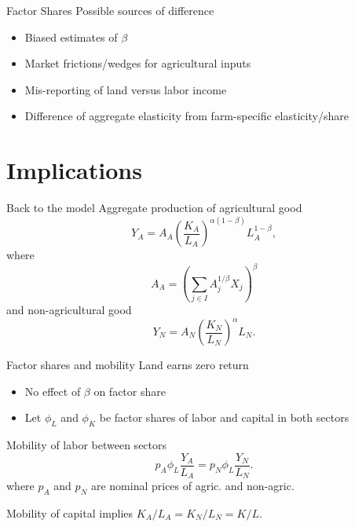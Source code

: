 \documentclass[10pt, xcolor=dvipsnames]{beamer}
\begin{document}
\begin{frame}{Factor Shares}
Possible sources of difference
\begin{itemize}
  \item Biased estimates of $\beta$
  \item Market frictions/wedges for agricultural inputs
  \item Mis-reporting of land versus labor income
  \item Difference of aggregate elasticity from farm-specific elasticity/share
\end{itemize}

\end{frame}

\section{Implications}

\begin{frame}{Back to the model}\label{extend}
Aggregate production of agricultural good
\begin{equation}
    Y_A = A_A \left(\frac{K_A}{L_A}\right)^{\alpha(1-\beta)} L_A^{1-\beta}, \label{EQ_caL_solve}
\end{equation}
where 
\begin{equation}
    A_A = \left(\sum_{j\in I} A_{j}^{1/\beta}X_{j} \right)^\beta \nonumber
\end{equation}
and non-agricultural good
\begin{equation}
    Y_N = A_N \left(\frac{K_N}{L_N}\right)^{\alpha} L_N. \label{EQ_YN}
\end{equation}
\end{frame}

\begin{frame}{Factor shares and mobility}
Land earns zero return
\begin{itemize}
  \item No effect of $\beta$ on factor share
  \item Let $\phi_L$ and $\phi_K$ be factor shares of labor and capital in both sectors
\end{itemize}

\vspace{2mm} Mobility of labor between sectors
\begin{equation}
    p_A \phi_L \frac{Y_A}{L_A} = p_N \phi_L \frac{Y_N}{L_N}. \label{EQ_mobility}
\end{equation}
where $p_A$ and $p_N$ are nominal prices of agric. and non-agric.

\vspace{2mm} Mobility of capital implies $K_A/L_A = K_N/L_N = K/L$.

\end{frame}
\end{document}
